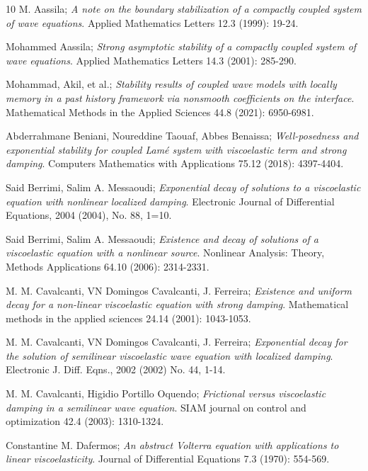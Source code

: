 \documentclass[reqno]{amsart}
\begin{document}
\begin{thebibliography}{10}
 M. Aassila;
\emph{A note on the boundary stabilization of a compactly coupled system of wave
equations}.
 Applied Mathematics Letters 12.3 (1999): 19-24.

  Mohammed Aassila;
\emph{Strong asymptotic stability of a compactly coupled system of wave equations}.
Applied Mathematics Letters 14.3 (2001): 285-290.

  Mohammad, Akil, et al.;
\emph{Stability results of coupled wave models with locally memory in a past history
framework via nonsmooth coefficients on the interface}.
 Mathematical Methods in the Applied Sciences 44.8 (2021): 6950-6981.

 Abderrahmane Beniani,  Noureddine Taouaf,  Abbes Benaissa;
\emph{Well-posedness and exponential stability for coupled Lam\'e system with
viscoelastic term and strong damping}. Computers Mathematics with Applications 75.12 (2018): 4397-4404.

  Said Berrimi, Salim A. Messaoudi;
\emph{Exponential decay of solutions to a viscoelastic equation with nonlinear 
localized damping}. Electronic Journal of Differential Equations,
 2004 (2004), No. 88, 1=10.
 
 Said Berrimi, Salim A. Messaoudi;
\emph{Existence and decay of solutions of a viscoelastic equation with a 
nonlinear source}. Nonlinear Analysis: Theory, Methods Applications 64.10 
(2006): 2314-2331.

 M. M. Cavalcanti, VN Domingos Cavalcanti, J. Ferreira;
\emph{Existence and uniform decay for a non-linear viscoelastic equation with 
strong damping}. Mathematical methods in the applied sciences 24.14 (2001): 1043-1053.

 M. M. Cavalcanti, VN Domingos Cavalcanti, J. Ferreira;
\emph{Exponential decay for the solution of semilinear viscoelastic wave equation 
with localized damping}. Electronic J. Diff. Eqns., 2002 (2002) No. 44, 1-14.

 M. M. Cavalcanti, Higidio Portillo Oquendo;
\emph{Frictional versus viscoelastic damping in a semilinear wave equation}.
 SIAM journal on control and optimization 42.4 (2003): 1310-1324.
 
 Constantine M. Dafermos;
\emph{An abstract Volterra equation with applications to linear viscoelasticity}.
Journal of Differential Equations 7.3 (1970): 554-569.


\end{thebibliography}
\end{document}
